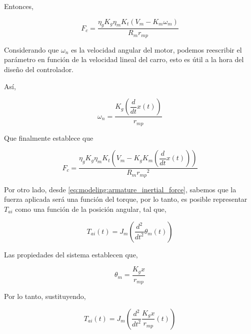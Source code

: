 \documentclass[12pt,a4paper]{article}
\begin{document}
        Entonces, 

        \begin{equation}
          F_{c} = \dfrac{ \eta_{g} K_{g} \eta_{m} K_{t} \left(V_{m} - K_{m} \omega_{m}\right)}{R_{m} r_{mp}}
          \label{eq:modeling:motor_force_simp1}
        \end{equation}

        Considerando que \(\omega_{n}\) es la velocidad angular del motor, podemos reescribir el 
        parámetro en función de la velocidad lineal del carro, esto es útil a la hora del diseño del controlador. 

        Así, 

        \begin{equation}
          \omega_{n} = \dfrac{K_{g} \left(\dfrac{d}{dt}x \left(t\right)\right)}{r_{mp}}
          \label{eq:modeling:angular_velocity_relationship}
        \end{equation}

        Que finalmente establece que 

        \begin{equation}
          F_{c} = \dfrac{\eta_{g} K_{g} \eta_{m} K_{t} \left(V_{m} - K_{g} K_{m} \left(\dfrac{d}{dt} x \left(t\right)\right)\right) }{R_{m} {r_{mp}}^{2}}
          \label{eq:modeling:motor_force_final}
        \end{equation}

        Por otro lado, desde \ref{eq:modeling:armature_inertial_force}, sabemos que la fuerza aplicada será una función del torque, 
        por lo tanto, es posible representar \( T_{ai}\) como una función de la posición angular, tal que, 

        \begin{equation}
          T_{ai} \left(t\right) = J_{m} \left(\dfrac{d^{2}}{dt^{2}} \theta_{m} \left(t\right)\right)
          \label{eq:modeling:armature_torque_simp1}
        \end{equation}

        Las propiedades del sistema establecen que, 

        \begin{equation}
          \theta_{m} = \dfrac{K_{g} x}{r_{mp}}
          \label{eq:modeling:gearbox_angular_relationship}
        \end{equation}

        Por lo tanto, sustituyendo, 

        \begin{equation}
          T_{ai} \left(t\right) = J_{m} \left(\dfrac{d^{2}}{dt^{2}} \dfrac{K_{g} x}{r_{mp}} \left(t\right)\right)
          \label{eq:modeling:armature_torque_final}
        \end{equation}
\end{document}
